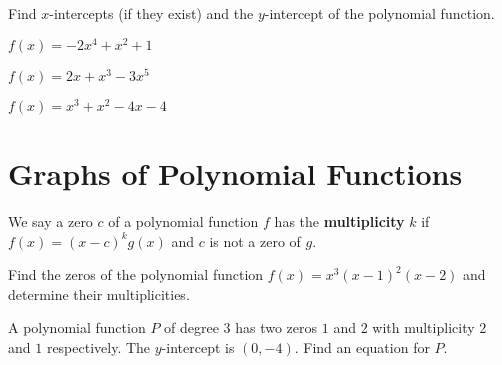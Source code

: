 \begin{exercise}
  Find $x$-intercepts (if they exist) and the $y$-intercept of the polynomial function.\\
  \begin{enumerate*}
  \item $f(x)=-2x^4+x^2+1$
  \item $f(x)=2x+x^3-3x^5$
  \item $f(x)=x^{3} + x^{2} - 4 x - 4$
\end{enumerate*}
\end{exercise}

\newpage
\section{Graphs of Polynomial Functions}

\begin{definition}
  We say a zero $c$ of a polynomial function $f$ has the \textbf{multiplicity} $k$ if $f(x)=(x-c)^kg(x)$ and $c$ is not a zero of $g$.
\end{definition}

\begin{example}
  Find the zeros of the polynomial function $f(x)=x^3(x-1)^2(x-2)$ and determine their multiplicities.
\end{example}

\begin{example}
  A polynomial function $P$ of degree 3 has two zeros $1$ and $2$ with multiplicity $2$ and $1$ respectively. The $y$-intercept is $(0, -4)$. Find an equation for $P$.
\end{example}


